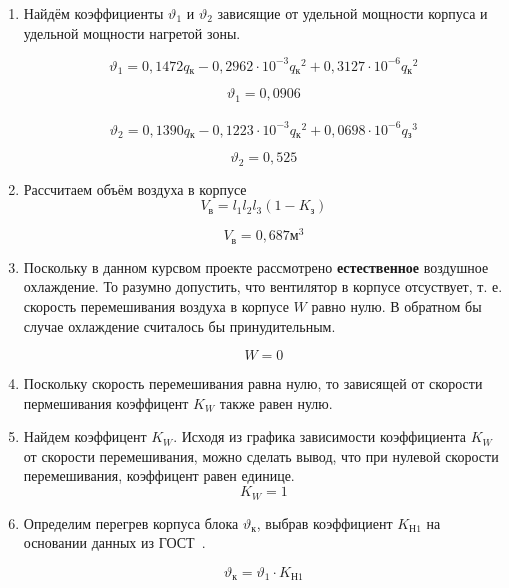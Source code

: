 \begin{enumerate}[label={\arabic*.}]
\item Найдём коэффициенты
$\vartheta_1$ и $\vartheta_2$ зависящие
от удельной мощности корпуса и удельной мощности нагретой зоны.

\begin{equation}
\vartheta_1 = 0,1472q\mathrm{_к} - 0,2962 \cdot 10^{-3}q\mathrm{_к}^2 + 0,3127 \cdot 10^{-6}q\mathrm{_к}^2
\end{equation}

$$\vartheta_1=0,0906$$\\

\begin{equation}
\vartheta_2 = 0,1390q\mathrm{_к} - 0,1223 \cdot 10^{-3}q\mathrm{_к}^2 + 0,0698 \cdot 10^{-6}q\mathrm{_з}^3
\end{equation}

$$\vartheta_2 = 0,525$$

\item Рассчитаем объём воздуха в корпусе
  \begin{equation}
    V\mathrm{_в} = l_1 l_2 l_3 (1 - K\mathrm{_з})
  \end{equation}

  $$V\mathrm{_в} = 0,687\mathrm{м^3}$$
  \item Поскольку в данном курсвом
    проекте рассмотрено \textbf{естественное} воздушное охлаждение.
    То разумно допустить, что вентилятор в корпусе отсуствует, т. е.
    скорость перемешивания воздуха в корпусе $W$ равно нулю.
    В обратном бы случае охлаждение считалось бы принудительным.

    $$W = 0$$
    
    \item Поскольку скорость перемешивания равна нулю, то зависящей от
      скорости пермешивания коэффицент $K_W$ также равен нулю.
    \item Найдем коэффицент $K_W$. Исходя из графика зависимости
коэффициента $K_W$ от скорости перемешивания, можно сделать вывод, что
при нулевой скорости перемешивания, коэффицент равен единице.
$$K_W = 1$$

\item Определим перегрев корпуса блока $\vartheta\mathrm{_к}$,
  выбрав коэффициент $K\mathrm{_{Н1}}$ на основании данных из
  ГОСТ~\cite{GOST_15150-69}.

  \begin{equation}
    \vartheta\mathrm{_к} = \vartheta_1 \cdot K\mathrm{_{Н1}}
  \end{equation}


\end{enumerate}
